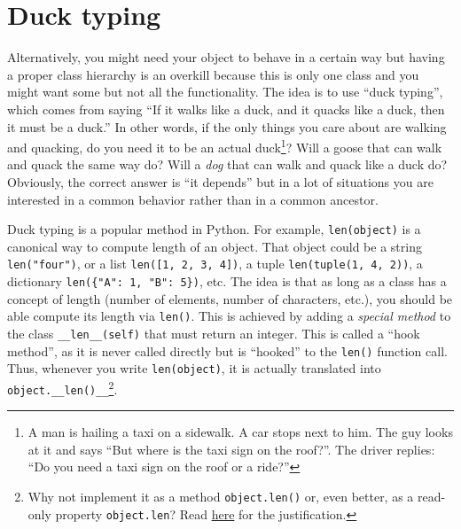 \documentclass[
]{book}
\begin{document}
\hypertarget{duck-typing}{%
\section{Duck typing}\label{duck-typing}}

Alternatively, you might need your object to behave in a certain way but having a proper class hierarchy is an overkill because this is only one class and you might want some but not all the functionality. The idea is to use ``duck typing'', which comes from saying ``If it walks like a duck, and it quacks like a duck, then it must be a duck.'' In other words, if the only things you care about are walking and quacking, do you need it to be an actual duck\footnote{A man is hailing a taxi on a sidewalk. A car stops next to him. The guy looks at it and says ``But where is the taxi sign on the roof?''. The driver replies: ``Do you need a taxi sign on the roof or a ride?''}? Will a goose that can walk and quack the same way do? Will a \emph{dog} that can walk and quack like a duck do? Obviously, the correct answer is ``it depends'' but in a lot of situations you are interested in a common behavior rather than in a common ancestor.

Duck typing is a popular method in Python. For example, \texttt{len(object)} is a canonical way to compute length of an object. That object could be a string \texttt{len("four")}, or a list \texttt{len({[}1,\ 2,\ 3,\ 4{]})}, a tuple \texttt{len(tuple(1,\ 4,\ 2))}, a dictionary \texttt{len(\{"A":\ 1,\ "B":\ 5\})}, etc. The idea is that as long as a class has a concept of length (number of elements, number of characters, etc.), you should be able compute its length via \texttt{len()}. This is achieved by adding a \emph{special method} to the class \texttt{\_\_len\_\_(self)} that must return an integer. This is called a ``hook method'', as it is never called directly but is ``hooked'' to the \texttt{len()} function call. Thus, whenever you write \texttt{len(object)}, it is actually translated into \texttt{object.\_\_len()\_\_}\footnote{Why not implement it as a method \texttt{object.len()} or, even better, as a read-only property \texttt{object.len}? Read \href{https://mail.python.org/pipermail/python-3000/2006-November/004643.html}{here} for the justification.}.
\end{document}
